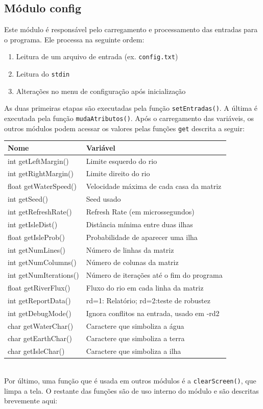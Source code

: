 \documentclass[11pt,a4paper]{article}
\begin{document}
\subsection{Módulo config}
Este módulo é responsável pelo carregamento e processamento das entradas para o programa. Ele processa na seguinte ordem:
\begin{enumerate}
\item Leitura de um arquivo de entrada (ex. \verb|config.txt|)
\item Leitura do \texttt{stdin}
\item Alterações no menu de configuração após inicialização
\end{enumerate}

As duas primeiras etapas são executadas pela função \verb|setEntradas()|. A última é executada pela função \verb|mudaAtributos()|. Após o carregamento das variáveis, os outros módulos podem acessar os valores pelas funções \texttt{get} descrita a seguir:\\

\begin{tabular}{|l|l|}
\hline 
\textbf{Nome} & \textbf{Variável} \\ 
\hline 
int getLeftMargin() & Limite esquerdo do rio \\ 
\hline 
int getRightMargin() & Limite direito do rio \\ 
\hline 
float getWaterSpeed() & Velocidade máxima de cada casa da matriz \\ 
\hline 
int getSeed() & Seed usado \\ 
\hline 
int getRefreshRate() & Refresh Rate (em microssegundos) \\ 
\hline 
int getIsleDist() & Distância mínima entre duas ilhas \\ 
\hline 
float getIsleProb() & Probabilidade de aparecer uma ilha \\ 
\hline 
int getNumLines() & Número de linhas da matriz \\ 
\hline 
int getNumColumns() & Número de colunas da matriz \\ 
\hline 
int getNumIterations() & Número de iterações até o fim do programa \\ 
\hline 
float getRiverFlux() & Fluxo do rio em cada linha da matriz \\ 
\hline 
int getReportData() & rd=1: Relatório; rd=2:teste de robustez \\ 
\hline 
int getDebugMode() & Ignora conflitos na entrada, usado em -rd2 \\ 
\hline 
char getWaterChar() & Caractere que simboliza a água \\ 
\hline 
char getEarthChar() & Caractere que simboliza a terra \\ 
\hline 
char getIsleChar() & Caractere que simboliza a ilha \\ 
\hline 
\end{tabular} 
\vspace{1cm}\\
Por último, uma função que é usada em outros módulos é a \verb|clearScreen()|, que limpa a tela. O restante das funções são de uso interno do módulo e são descritas brevemente aqui:
\end{document}
